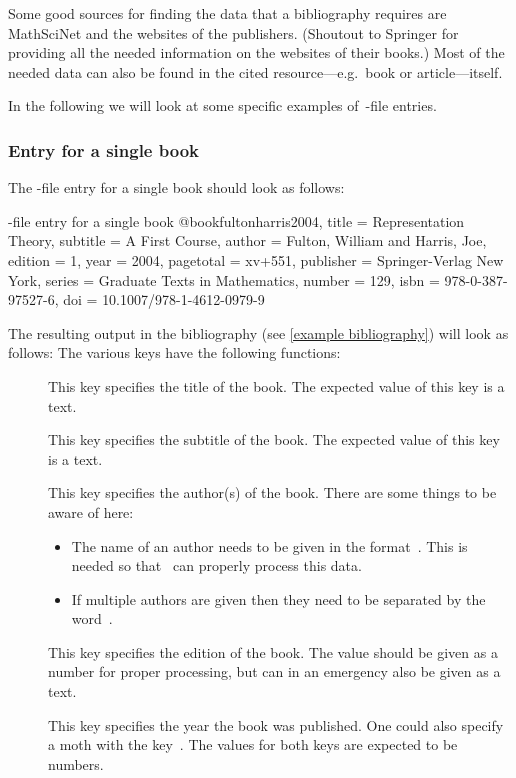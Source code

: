 \begin{refsection}
Some good sources for finding the data that a bibliography requires are MathSciNet and the websites of the publishers. (Shoutout to Springer for providing all the needed information on the websites of their books.)
Most of the needed data can also be found in the cited resource---e.g.\ book or article---itself.

In the following we will look at some specific examples of~-file entries.

\subsubsection{Entry for a single book}

The -file entry for a single book should look as follows: 
\begin{showcode}[label = {fulton harris bib entry}]{-file entry for a single book}
@book{fultonharris2004,
  title     = {Representation Theory},
  subtitle  = {A First Course},
  author    = {Fulton, William and Harris, Joe},
  edition   = {1},
  year      = {2004},
  pagetotal = {xv+551},
  publisher = {Springer-Verlag New York},
  series    = {Graduate Texts in Mathematics},
  number    = {129},
  isbn      = {978-0-387-97527-6},
  doi       = {10.1007/978-1-4612-0979-9}
}
\end{showcode}
The resulting output in the bibliography (see \cref{example bibliography}) will look as follows:
The various keys have the following functions:

\begin{description}
  \item[]
    This key specifies the title of the book.
    The expected value of this key is a text.
  \item[]
    This key specifies the subtitle of the book.
    The expected value of this key is a text.
  \item[]
    This key specifies the author(s) of the book.
    There are some things to be aware of here:
    \begin{itemize}
      \item
        The name of an author needs to be given in the format~.
        This is needed so that~ can properly process this data.
      \item
        If multiple authors are given then they need to be separated by the word~.
    \end{itemize}
  \item[]
    This key specifies the edition of the book.
    The value should be given as a number for proper processing, but can in an emergency also be given as a text.
  \item[]
    This key specifies the year the book was published.
    One could also specify a moth with the key~.
    The values for both keys are expected to be numbers.
    

\end{description}
\end{refsection}
